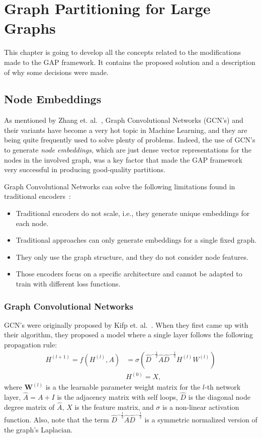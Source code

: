 %
%
\let\textcircled=\pgftextcircled
\chapter{Graph Partitioning for Large Graphs}
\label{Chapter3}
This chapter is going to develop all the concepts related to the modifications made to the GAP framework. It contains the proposed solution and a description of why some decisions were made.

\section{Node Embeddings}
As mentioned by Zhang et. al.~\cite{gcnreview}, Graph Convolutional Networks (GCN's) and their variants have become a very hot topic in Machine Learning, and they are being quite frequently used to solve plenty of problems. Indeed, the use of GCN's to generate \textit{node embeddings}, which are just dense vector representations for the nodes in the involved graph, was a key factor that made the GAP framework very successful in producing good-quality partitions.

Graph Convolutional Networks can solve the following limitations found in traditional encoders~\cite{encoderlimitations}:
\begin{itemize}
    \item Traditional encoders do not scale, i.e., they generate unique embeddings for each node.
    \item Traditional approaches can only generate embeddings for a single fixed graph.
    \item They only use the graph structure, and they do not consider node features.
    \item Those encoders focus on a specific architecture and cannot be adapted to train with different loss functions.
\end{itemize}

\subsection{Graph Convolutional Networks}
GCN's were originally proposed by Kifp et. al.~\cite{gcn}. When they first came up with their algorithm, they proposed a model where a single layer follows the following propagation rule:
\begin{align}
    \label{eq:gcn}
    H^{(l+1)} = f(H^{(l)}, A) &= \sigma\left(\hat{D}^{-\frac{1}{2}}\hat{A}\hat{D}^{-\frac{1}{2}}H^{(l)}W^{(l)}\right) \\
    & H^{(0)} = X,
\end{align}
where $\boldsymbol W^{(l)}$ is a the learnable parameter weight matrix for the $l$-th network layer, $\hat{A}=A+I$ is the adjacency matrix with self loops, $\hat{D}$ is the diagonal node degree matrix of $\hat{A}$, $X$ is the feature matrix, and $\sigma$ is a non-linear activation function. Also, note that the term $\hat{D}^{-\frac{1}{2}}\hat{A}\hat{D}^{-\frac{1}{2}}$ is a symmetric normalized version of the graph's Laplacian.

